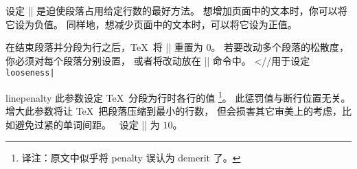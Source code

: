 设定 |\looseness| 是迫使段落占用给定行数的最好方法。
想增加页面中的文本时，你可以将它设为负值。
同样地，想减少页面中的文本时，可以将它设为正值。

在结束段落并分段为行之后，\TeX\ 将 |\looseness| 重置为 $0$。
若要改动多个段落的松散度，你必须对每个段落分别设置，
或者将改动放在 |\everypar|
\ctsref\everypar 命令中。
^^|\everypar//用于设定 \b\tt\\looseness\e|
\enddesc

\begindesc
\cts linepenalty {}
\explain
{}
此参数设定 \TeX\ 分段为行时各行的值\thinspace%
\footnote{译注：原文中似乎将 penalty 误认为 demerit 了。}。
此惩罚值与断行位置无关。
增大此参数将让  \TeX\ 把段落压缩到最小的行数，
但会损害其它审美上的考虑，比如避免过紧的单词间距。
\PlainTeX\ 设定 |\linepenalty| 为 $10$。
\enddesc

